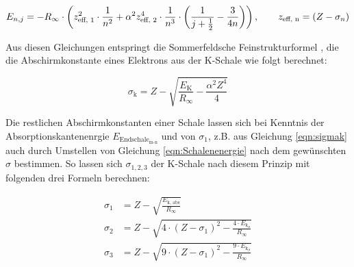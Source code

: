 \documentclass[titlepage = firstcover]{scrartcl}
\begin{document}
            \begin{equation}
              E_{n,j} = -R_{\infty} \cdot \left(z_{\text{eff, 1}}^2 \cdot \frac{1}{n^2} + \alpha ^2 z_{\text{eff, 2}}^4 \cdot \frac{1}{n^3} \cdot \left(\frac{1}{j+\frac{1}{2}} - \frac{3}{4n}\right)\right), \qquad z_{\text{eff, n}} = (Z-\sigma_n)
              \noindent \label{eqn:Enj}
            \end{equation}
            
            \noindent
            Aus diesen Gleichungen entspringt die Sommerfeldsche Feinstrukturformel , die die Abschirmkonstante eines Elektrons aus der K-Schale wie folgt berechnet:

            \begin{equation}
              \sigma_{\text{k}} = Z - \sqrt{\frac{E_{\text{K}}}{R_{\infty}} - \frac{\alpha ^2 Z^4}{4}}
              \label{eqn:sigmak}
            \end{equation}
            
            \noindent
            Die  restlichen Abschirmkonstanten einer Schale lassen sich bei Kenntnis der Absorptionskantenenrgie $E_{\text{Endschale}_{\text{m-n}}}$ und von $\sigma_1$, z.B. aus Gleichung 
            \ref{eqn:sigmak} auch durch Umstellen von Gleichung \ref{eqn:Schalenenergie} nach dem gewünschten $\sigma$ bestimmen. So lassen sich $\sigma_{1,2,3}$ der K-Schale nach diesem
            Prinzip mit folgenden drei Formeln berechnen:
            
            \begin{align}
              \sigma_1 &= Z - \sqrt{\frac{E_{\text{k, abs}}}{R_{\infty}}} \\
              \sigma_2 &= Z - \sqrt{4 \cdot \left(Z - \sigma_1\right)^2 - \frac{4 \cdot E_{\text{k}_{\alpha}}}{R_{\infty}}} \\
              \sigma_3 &= Z - \sqrt{9 \cdot \left(Z - \sigma_1\right)^2 - \frac{9 \cdot E_{\text{k}_{\beta}}}{R_{\infty}}} 
              \label{eqn:Cusigmas}
            \end{align}
            \noindent

            \FloatBarrier
\end{document}
